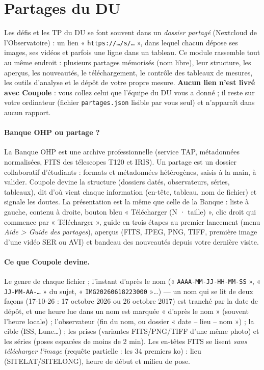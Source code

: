 \section{Partages du DU}\label{sec:partages}
Les défis et les TP du DU se font souvent dans un \emph{dossier partagé} (Nextcloud de l'Observatoire) : un lien
« \texttt{https://…/s/…} », dans lequel chacun dépose ses images, ses vidéos et parfois une ligne dans un tableau.
Ce module rassemble tout au même endroit : plusieurs partages mémorisés (nom libre), leur structure, les aperçus, les
nouveautés, le téléchargement, le contrôle des tableaux de mesures, les outils d'analyse et le dépôt de votre propre
mesure. \textbf{Aucun lien n'est livré avec Coupole} : vous collez celui que l'équipe du DU vous a donné ; il reste
sur votre ordinateur (fichier \texttt{partages.json} lisible par vous seul) et n'apparaît dans aucun rapport.

\paragraph{Banque OHP ou partage ?} La Banque OHP est une archive professionnelle (service TAP, métadonnées
normalisées, FITS des télescopes T120 et IRIS). Un partage est un dossier collaboratif d'étudiants : formats et
métadonnées hétérogènes, saisis à la main, à valider. Coupole devine la structure (dossiers datés, observateurs,
séries, tableaux), dit d'où vient chaque information (en-tête, tableau, nom de fichier) et signale les doutes. La
présentation est la même que celle de la Banque : liste à gauche, contenu à droite, bouton bleu
« Télécharger (N · taille) », clic droit qui commence par « Télécharger », guide en trois étapes au premier lancement
(menu \emph{Aide > Guide des partages}), aperçus (FITS, JPEG, PNG, TIFF, première image d'une vidéo SER ou AVI) et
bandeau des nouveautés depuis votre dernière visite.

\paragraph{Ce que Coupole devine.} Le genre de chaque fichier ; l'instant d'après le nom (« \texttt{AAAA-MM-JJ-HH-MM-SS} »,
« \texttt{JJ-MM-AA-…} » du sujet, « \texttt{IMG20260618223000} »…) — un nom qui se lit de deux façons
(17-10-26 : 17 octobre 2026 ou 26 octobre 2017) est tranché par la date de dépôt, et une heure lue dans un nom est
marquée « d'après le nom » (souvent l'heure locale) ; l'observateur (fin du nom, ou dossier
« date – lieu – nom ») ; la cible (ISS, Lune…) ; les prises (variantes FITS/PNG/TIFF d'une même photo) et les séries
(poses espacées de moins de 2 min). Les en-têtes FITS se lisent \emph{sans télécharger l'image} (requête partielle :
les 34 premiers ko) : lieu (SITELAT/SITELONG), heure de début et milieu de pose.

